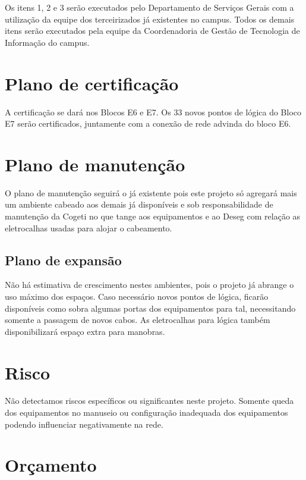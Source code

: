 \documentclass[	DIV=calc,
							paper=a4,
							fontsize=12pt,
							onecolumn]{scrartcl}
\begin{document}
Os itens 1, 2 e 3 serão executados pelo Departamento de Serviços Gerais com a utilização da equipe dos terceirizados já existentes no campus.
Todos os demais itens serão executados pela equipe da Coordenadoria de Gestão de Tecnologia de Informação do campus.

\section{Plano de certificação}
A certificação se dará nos Blocos E6 e E7. Os 33 novos pontos de lógica do Bloco E7 serão certificados, juntamente com a conexão de rede advinda do bloco E6.

\section{Plano de manutenção}

O plano de manutenção seguirá o já existente pois este projeto só agregará mais um ambiente cabeado aos demais já disponíveis e sob responsabilidade de manutenção da Cogeti no que tange aos equipamentos e ao Deseg com relação as eletrocalhas usadas para alojar o cabeamento.

\subsection{Plano de expansão}

Não há estimativa de crescimento nestes ambientes, pois o projeto já abrange o uso máximo dos espaços. Caso necessário novos pontos de lógica, ficarão disponíveis como sobra algumas portas dos equipamentos para tal, necessitando somente a passagem de novos cabos. As eletrocalhas para lógica também disponibilizará espaço extra para manobras.

\section{Risco}

Não detectamos riscos específicos ou significantes neste projeto. Somente queda dos equipamentos no manuseio ou configuração inadequada dos equipamentos podendo influenciar negativamente na rede.

\section{Orçamento}
\end{document}
